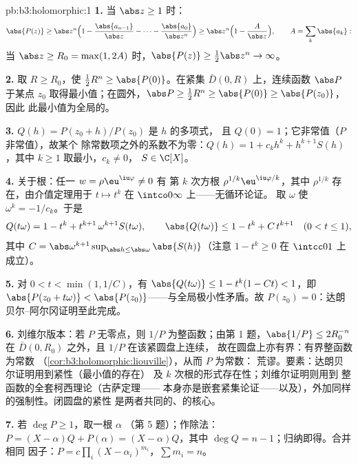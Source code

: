 \begin{solution}{pb:b3:holomorphic:1}
\textbf{1.} 当 $\abs z \geq 1$ 时：
\[
\abs{P(z)} \geq \abs z^n\Bigl(1 -
\frac{\abs{a_{n-1}}}{\abs z} - \dots -
\frac{\abs{a_0}}{\abs z^n}\Bigr)
\geq \abs z^n\Bigl(1 - \frac{A}{\abs z}\Bigr),
\qquad A = \sum_k\abs{a_k} :
\]
当 $\abs z \geq R_0 = \max(1, 2A)$ 时，$\abs{P(z)} \geq
\frac12\abs z^n \to \infty$。

\textbf{2.} 取 $R \geq R_0$，使 $\frac12R^n \geq
\abs{P(0)}$。在紧集 $\bar D(0, R)$ 上，连续函数
$\abs P$ 于某点 $z_0$ 取得最小值；在圆外，$\abs P
\geq \frac12R^n \geq \abs{P(0)} \geq \abs{P(z_0)}$，因此
此最小值为全局的。

\textbf{3.} $Q(h) = P(z_0 + h)/P(z_0)$ 是 $h$ 的多项式，
且 $Q(0) = 1$；它非常值（$P$ 非常值），故某个
除常数项之外的系数不为零：$Q(h) = 1 +
c_kh^k + h^{k+1}S(h)$，其中 $k \geq 1$ 取最小，$c_k \neq 0$，
$S \in \C[X]$。

\textbf{4.} 关于根：任一 $w = \rho\eu^{\iu\varphi} \neq 0$ 有
第 $k$ 次方根 $\rho^{1/k}\eu^{\iu\varphi/k}$，其中
$\rho^{1/k}$ 存在，由介值定理用于
$t \mapsto t^k$ 在 $\intco0\infty$ 上——无循环论证。
取 $\omega$ 使 $\omega^k = -1/c_k$。于是
\[
Q(t\omega) = 1 - t^k + t^{k+1}\,\omega^{k+1}S(t\omega),
\qquad
\abs{Q(t\omega)} \leq 1 - t^k + C\,t^{k+1}
\quad (0 < t \leq 1),
\]
其中 $C = \abs\omega^{k+1}\sup_{\abs h \leq
\abs\omega}\abs{S(h)}$（注意 $1 - t^k \geq 0$ 在 $\intcc01$ 上成立）。

\textbf{5.} 对 $0 < t < \min(1, 1/C)$，有 $\abs{Q(t\omega)}
\leq 1 - t^k(1 - Ct) < 1$，即 $\abs{P(z_0 + t\omega)} <
\abs{P(z_0)}$——与全局极小性矛盾。故
$P(z_0) = 0$：达朗贝尔--阿尔冈证明至此完成。

\textbf{6.} 刘维尔版本：若 $P$ 无零点，则 $1/P$
为整函数；由第 1 题，$\abs{1/P} \leq 2R_0^{-n}$ 在
$\bar D(0, R_0)$ 之外，且 $1/P$ 在该紧圆盘上连续，
故在圆盘上亦有界：有界整函数为常数
（\cref{cor:b3:holomorphic:liouville}），从而 $P$ 为常数：
荒谬。要素：达朗贝尔证明用到紧性（最小值的存在）
及 $k$ 次根的形式存在性；刘维尔证明则用到
整函数的全套柯西理论（古萨定理——
本身亦是嵌套紧集论证——以及），外加同样的强制性。闭圆盘的紧性
是两者共同的、的核心。

\textbf{7.} 若 $\deg P \geq 1$，取一根 $\alpha$
（第 5 题）；作除法：$P = (X - \alpha)Q + P(\alpha) = (X -
\alpha)Q$，其中 $\deg Q = n - 1$；归纳即得。合并相同
因子：$P = c\prod_i(X - \alpha_i)^{m_i}$，$\sum m_i = n$。


\end{solution}
